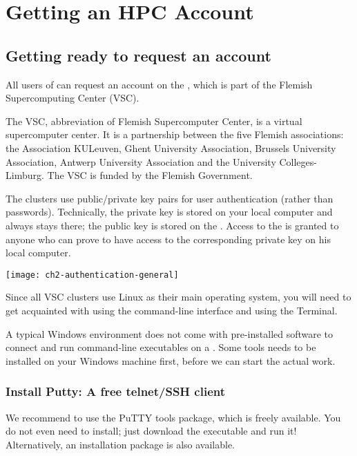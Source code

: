 \chapter{Getting an HPC Account}
\label{ch:getting-a-hpc-account}

\section{Getting ready to request an account}
\label{sec:getting-ready-to-request-an-account}

All users of \association can request an account on
the \hpc, which is part of the Flemish Supercomputing Center (VSC).

The VSC, abbreviation of Flemish Supercomputer Center, is a virtual
supercomputer center. It is a partnership between the five Flemish
associations: the Association KULeuven,  Ghent University Association, Brussels
University Association, Antwerp University Association and the University
Colleges-Limburg. The VSC is funded by the Flemish Government.

The \hpc clusters use public/private key pairs for user authentication
(rather than passwords). Technically, the private key is stored on your local
computer and always stays there; the public key is stored on the \hpc.
Access to the \hpc is granted to anyone who can prove to have access to the
corresponding private key on his local computer.

\texttt{[image: ch2-authentication-general]}

Since all VSC clusters use Linux as their main operating system, you will
need to get acquainted with using the command-line interface and using the
Terminal.

\ifwindows
  A typical Windows environment does not come with pre-installed
  software to connect and run command-line executables on a \hpc. Some tools
  needs to be installed on your Windows machine first, before we can start the
  actual work.

  \subsection{Install Putty: A free telnet/SSH client}
  \label{sec:install-putty}

  We recommend to use the PuTTY tools package, which is freely available. You
  do not even need to install; just download the executable and run it!
  Alternatively, an installation package is also available.

